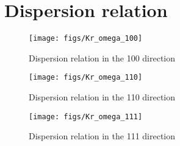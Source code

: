 \section{Dispersion relation}

\begin{figure}[H]
  \centering
  \texttt{[image: figs/Kr\_omega\_100]}
  \caption{Dispersion relation in the 100 direction}
  \label{fig:100}
\end{figure}

\begin{figure}[H]
  \centering
  \texttt{[image: figs/Kr\_omega\_110]}
  \caption{Dispersion relation in the 110 direction}
  \label{fig:110}
\end{figure}

\begin{figure}[H]
  \centering
  \texttt{[image: figs/Kr\_omega\_111]}
  \caption{Dispersion relation in the 111 direction}
  \label{fig:111}
\end{figure}
